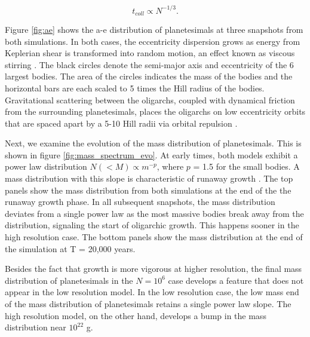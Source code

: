 \begin{equation}\label{eq:coll_timescale_N}
t_{coll} \propto N^{-1/3}.
\end{equation}

Figure \ref{fig:ae} shows the a-e distribution of planetesimals at three snapshots from both simulations. In both cases, the 
eccentricity dispersion grows as energy from Keplerian shear is transformed into random motion, an effect known as viscous 
stirring \cite{ohtsuki02}. The black circles denote the semi-major axis and eccentricity of the 6 largest bodies. The area of the 
circles indicates the mass of the bodies and the horizontal bars are each scaled to 5 times the Hill radius of the bodies. 
Gravitational scattering between the oligarchs, coupled with dynamical friction from the surrounding planetesimals, places the 
oligarchs on low eccentricity orbits that are spaced apart by a 5-10 Hill radii via orbital repulsion \cite{kokubo98}.

Next, we examine the evolution of the mass distribution of planetesimals. This is shown in figure \ref{fig:mass_spectrum_evo}. At 
early times, both models exhibit a power law distribution $N(<M) \propto m^{-p}$, where $p$ = 1.5 for the small bodies. A mass 
distribution with this slope is characteristic of runaway growth \cite{wetherill93}. The top panels show the mass distribution from 
both simulations at the end of the the runaway growth phase. In all subsequent snapshots, the mass distribution deviates from a 
single power law as the most massive bodies break away from the distribution, signaling the start of oligarchic growth. This 
happens sooner in the high resolution case. The bottom panels show the mass distribution at the end of the simulation at T = 
20,000 years.

Besides the fact that growth is more vigorous at higher resolution, the final mass distribution of planetesimals in the $N = 10^{6}$ 
case develops a feature that does not appear in the low resolution model. In the low resolution case, the low mass end of the 
mass distribution of planetesimals retains a single power law slope. The high resolution model, on the other hand, develops a 
bump in the mass distribution near $10^{22}$ g.

